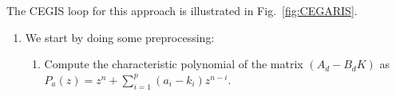 \documentclass[runningheads,a4paper]{llncs}
\newcommand{\mat}[1]{\boldsymbol{#1}}
\begin{document}
  The CEGIS loop for this approach is illustrated in Fig.~\ref{fig:CEGARIS}.



\begin{enumerate}
\item 
  We start by doing some preprocessing:%
  \begin{enumerate}
\item Compute the characteristic polynomial of the matrix $(A_d-B_dK)$ as 
$P_a(z) = z^n+\sum_{i=1}^p{(a_i-k_i)z^{n-i}}$.




\end{enumerate}
\end{enumerate}
\end{document}

